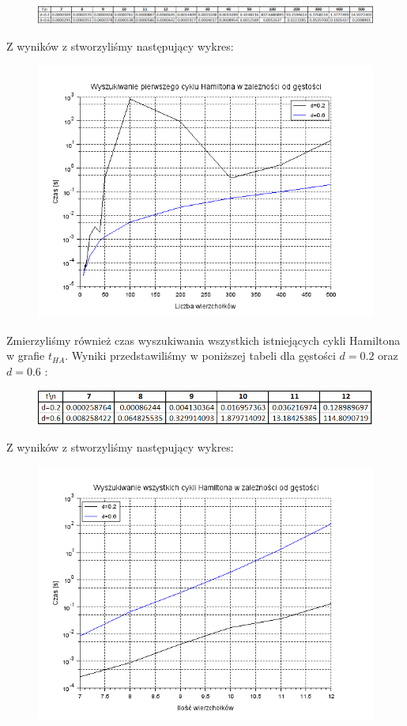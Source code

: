 \documentclass{article}
\begin{document}
\begin{figure}[h!]
\centering
  \includegraphics[width=1.0\linewidth]{zad4_H1_tabela.png}
\end{figure}%

Z wyników z stworzyliśmy następujący wykres:

\begin{figure}[h!]
\centering
  \includegraphics[width=0.5\linewidth]{zad4_H1_wykres.png}
\end{figure}%

Zmierzyliśmy również czas wyszukiwania wszystkich istniejących cykli Hamiltona w grafie $t_{HA}$. Wyniki przedstawiliśmy w poniższej tabeli dla gęstości $d=0.2$ oraz $d=0.6$ :

\begin{figure}[h!]
\centering
  \includegraphics[width=0.7\linewidth]{zad4_HA_tabela.png}
\end{figure}%

Z wyników z stworzyliśmy następujący wykres:

\begin{figure}[h!]
\centering
  \includegraphics[width=0.5\linewidth]{zad4_HA_wykres.png}
\end{figure}%
\end{document}
